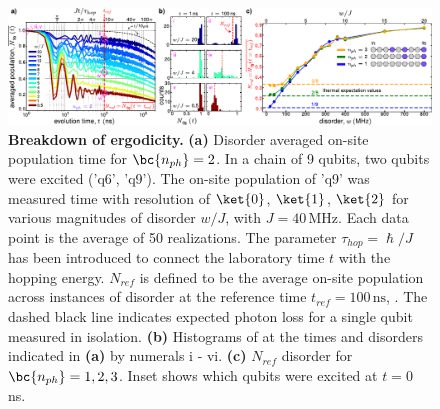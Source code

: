 \begin{figure}[!t]
    \includegraphics[width=550 pt, keepaspectratio]{./PDF/f2_190731_237p.pdf}
    \caption{\small
    \textbf{Breakdown of ergodicity.}
    \textbf{(a)} Disorder averaged on-site population  time for $\bc{n_{ph}}=2$.
    In a chain of 9 qubits, two qubits were excited ('q6', 'q9').
    The on-site population of 'q9' was measured  time with resolution of $\ket{0}$, $\ket{1}$, $\ket{2}$ for various magnitudes of disorder $w/J$, with $J=40 \, \text{MHz}$.  %
    Each data point is the average of 50 realizations.
    The parameter $\tau_{hop}=\hslash/J$ has been introduced to connect the laboratory time $t$ with the hopping energy.
    $N_{ref}$ is defined to be the average on-site population across instances of disorder at the reference time $t_{ref}=100\,\text{ns}$, .
    The dashed black line indicates expected photon loss for a single qubit measured in isolation.
    \textbf{(b)} Histograms of \bc{$\nqninet$}  at the times and disorders indicated in \textbf{(a)} by numerals i - vi. %
    \textbf{(c)} $N_{ref}$  disorder for $\bc{n_{ph}}=1, 2, 3$.
    Inset shows which qubits were excited at $t=0$ ns.
    }
    \label{fig_2i}
\end{figure}
\afterpage{\FloatBarrier}




